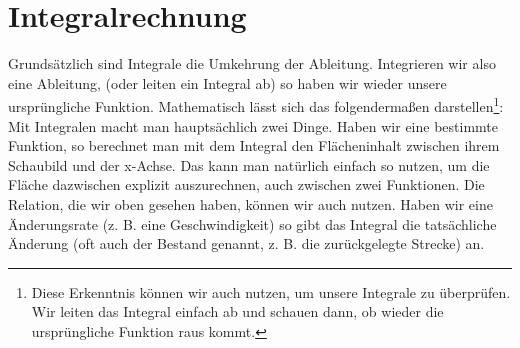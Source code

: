 \section{Integralrechnung}
	Grundsätzlich sind Integrale die Umkehrung der Ableitung. Integrieren wir also
	eine Ableitung, (oder leiten ein Integral ab) so haben wir wieder unsere
	ursprüngliche Funktion. Mathematisch lässt sich das folgendermaßen
	darstellen\footnote{Diese Erkenntnis können wir auch nutzen, um unsere
	Integrale zu überprüfen. Wir leiten das Integral einfach ab und schauen dann,
	ob wieder die ursprüngliche Funktion raus kommt.}:
	\formel{\[\int f'(x)\ dx=f(x)\]}
	Mit Integralen macht man hauptsächlich zwei Dinge. Haben wir eine bestimmte
	Funktion, so berechnet man mit dem Integral den Flächeninhalt zwischen ihrem
	Schaubild und der x-Achse. Das kann man natürlich einfach so nutzen, um die
	Fläche dazwischen explizit auszurechnen, auch zwischen zwei Funktionen. Die
	Relation, die wir oben gesehen haben, können wir auch nutzen. Haben wir eine
	Änderungsrate (z. B. eine Geschwindigkeit) so gibt das Integral die
	tatsächliche Änderung (oft auch der Bestand genannt, z. B. die zurückgelegte
	Strecke) an.

	

	

	

	

	
